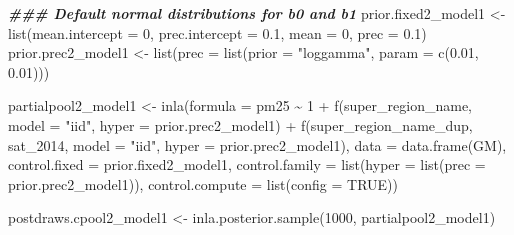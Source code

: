 \documentclass[
]{article}
\newenvironment{Shaded}{\begin{snugshade}}{\end{snugshade}}
\newcommand{\AttributeTok}[1]{\textcolor[rgb]{0.77,0.63,0.00}{#1}}
\newcommand{\ConstantTok}[1]{\textcolor[rgb]{0.00,0.00,0.00}{#1}}
\newcommand{\DecValTok}[1]{\textcolor[rgb]{0.00,0.00,0.81}{#1}}
\newcommand{\DocumentationTok}[1]{\textcolor[rgb]{0.56,0.35,0.01}{\textbf{\textit{#1}}}}
\newcommand{\FloatTok}[1]{\textcolor[rgb]{0.00,0.00,0.81}{#1}}
\newcommand{\FunctionTok}[1]{\textcolor[rgb]{0.00,0.00,0.00}{#1}}
\newcommand{\NormalTok}[1]{#1}
\newcommand{\OtherTok}[1]{\textcolor[rgb]{0.56,0.35,0.01}{#1}}
\newcommand{\SpecialCharTok}[1]{\textcolor[rgb]{0.00,0.00,0.00}{#1}}
\newcommand{\StringTok}[1]{\textcolor[rgb]{0.31,0.60,0.02}{#1}}
\begin{document}
\begin{Shaded}
\begin{Highlighting}[]
\DocumentationTok{\#\#\# Default normal distributions for b0 and b1}
\NormalTok{prior.fixed2\_model1 }\OtherTok{\textless{}{-}} \FunctionTok{list}\NormalTok{(}\AttributeTok{mean.intercept =} \DecValTok{0}\NormalTok{, }\AttributeTok{prec.intercept =} \FloatTok{0.1}\NormalTok{,}
                    \AttributeTok{mean =} \DecValTok{0}\NormalTok{, }\AttributeTok{prec =} \FloatTok{0.1}\NormalTok{)}
\NormalTok{prior.prec2\_model1 }\OtherTok{\textless{}{-}} \FunctionTok{list}\NormalTok{(}\AttributeTok{prec =} \FunctionTok{list}\NormalTok{(}\AttributeTok{prior =} \StringTok{"loggamma"}\NormalTok{, }
                               \AttributeTok{param =} \FunctionTok{c}\NormalTok{(}\FloatTok{0.01}\NormalTok{, }\FloatTok{0.01}\NormalTok{)))}

\NormalTok{partialpool2\_model1 }\OtherTok{\textless{}{-}} \FunctionTok{inla}\NormalTok{(}\AttributeTok{formula =}\NormalTok{ pm25 }\SpecialCharTok{\textasciitilde{}} \DecValTok{1} \SpecialCharTok{+}    
                       \FunctionTok{f}\NormalTok{(super\_region\_name,  }
                         \AttributeTok{model =} \StringTok{"iid"}\NormalTok{, }
                         \AttributeTok{hyper =}\NormalTok{ prior.prec2\_model1) }\SpecialCharTok{+} 
                       \FunctionTok{f}\NormalTok{(super\_region\_name\_dup, sat\_2014, }
                         \AttributeTok{model =} \StringTok{"iid"}\NormalTok{,}
                         \AttributeTok{hyper =}\NormalTok{ prior.prec2\_model1), }
                     \AttributeTok{data =} \FunctionTok{data.frame}\NormalTok{(GM), }
                     \AttributeTok{control.fixed =}\NormalTok{ prior.fixed2\_model1,}
                     \AttributeTok{control.family =} \FunctionTok{list}\NormalTok{(}\AttributeTok{hyper =} \FunctionTok{list}\NormalTok{(}\AttributeTok{prec =}\NormalTok{ prior.prec2\_model1)), }
                    \AttributeTok{control.compute =} \FunctionTok{list}\NormalTok{(}\AttributeTok{config =} \ConstantTok{TRUE}\NormalTok{))}

\NormalTok{postdraws.cpool2\_model1 }\OtherTok{\textless{}{-}} \FunctionTok{inla.posterior.sample}\NormalTok{(}\DecValTok{1000}\NormalTok{, partialpool2\_model1)}


\end{Highlighting}
\end{Shaded}
\end{document}
